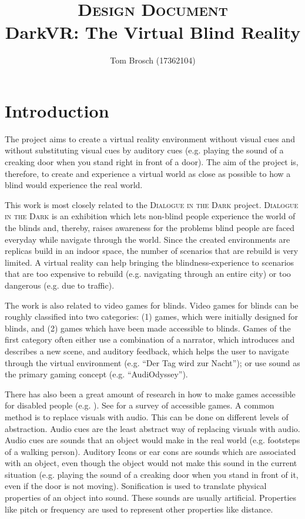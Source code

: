 \documentclass{article}
\title{
  {\normalsize \textsc{Design Document}\\[0.5em]}
  DarkVR: The Virtual Blind Reality
}
\author{Tom Brosch (17362104)}
\date{\email{brosch.tom@gmail.com}}
\begin{document}
\maketitle

\section{Introduction}

The project aims to create a virtual reality environment without visual cues and
without substituting visual cues by auditory cues (e.g. playing the sound of a
creaking door when you stand right in front of a door). The aim of the project
is, therefore, to create and experience a virtual world as close as possible to
how a blind would experience the real world.

This work is most closely related to the \textsc{Dialogue in the Dark}
project\cite{dialog}. \textsc{Dialogue in the Dark} is an exhibition which lets
non-blind people experience the world of the blinds and, thereby, raises
awareness for the problems blind people are faced everyday while navigate
through the world. Since the created environments are replicas build in an
indoor space, the number of scenarios that are rebuild is very limited. A
virtual reality can help bringing the blindness-experience to scenarios that are
too expensive to rebuild (e.g. navigating through an entire city) or too
dangerous (e.g. due to traffic).

The work is also related to video games for blinds. Video games for blinds can
be roughly classified into two categories: (1) games, which were initially
designed for blinds, and (2) games which have been made accessible to blinds.
Games of the first category often either use a combination of a
narrator, which introduces and describes a new scene, and auditory feedback,
which helps the user to navigate through the virtual environment (e.g. ``Der Tag
wird zur Nacht''\cite{dertag}); or use sound as the primary gaming concept (e.g.
``AudiOdyssey''\cite{audiodyssey}).

There has also been a great amount of research in how to make games accessible
for disabled people (e.g. \cite{chile, terraformers, secondlife,
tankcommander}). See \cite{survey} for a survey of accessible games. A common
method is to replace visuals with audio. This can be done on different levels of
abstraction. Audio cues are the least abstract way of replacing visuals with
audio. Audio cues are sounds that an object would make in the real world (e.g.
footsteps of a walking person). Auditory Icons or ear cons are sounds which are
associated with an object, even though the object would not make this sound in
the current situation (e.g. playing the sound of a creaking door when you stand
in front of it, even if the door is not moving). Sonification is used to
translate physical properties of an object into sound. These sounds are usually
artificial. Properties like pitch or frequency are used to represent other
properties like distance.
\end{document}
